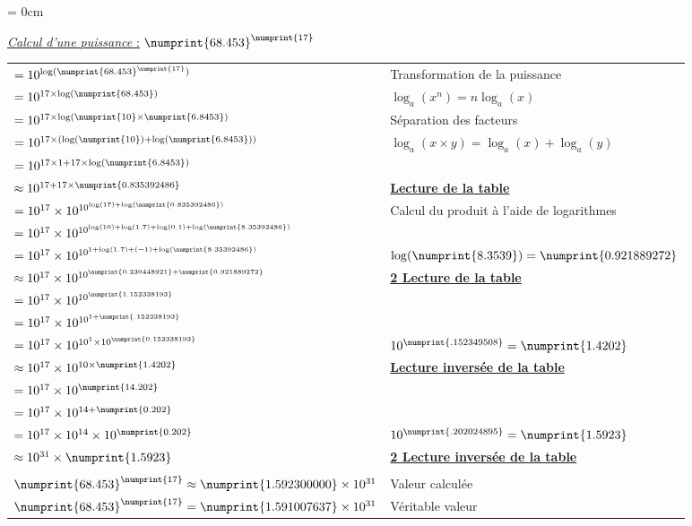 \documentclass[a4paper]{article}
\begin{document}
{\parindent = 0cm

\underline{\textit{Calcul d'une puissance} :} $\numprint{68.453}^{\numprint{17}}$
\vspace{0.2cm}

\begin{large}
\begin{tabular}{l|l}

$= 10 ^{\log ( \numprint{68.453}^{\numprint{17}} ) }$ & \small Transformation de la puissance \\
$= 10 ^{17 \times \log ( \numprint{68.453} ) }$ & \small $ \log_a ( x^n ) = n \log_a (x) $ \\
$= 10 ^{17 \times \log ( \numprint{10} \times \numprint{6.8453} ) }$ & \small Séparation des facteurs\\
$= 10 ^{17 \times (\log ( \numprint{10}) + \log (\numprint{6.8453} ))} $ & \small $ \log_a ( x \times y ) = \log_a (x) + \log_a (y) $\\
$= 10 ^{17 \times 1 + 17 \times \log (\numprint{6.8453} )}$ & \\
$\approx 10 ^{17 + 17 \times \numprint{0.835 392 486}}$ & \small \underline{\textbf{Lecture de la table}}\\
$= 10 ^{17} \times 10^{10^{\log(17) + \log(\numprint{0.835 392 486})}}$ & \small Calcul du produit à l'aide de logarithmes\\
$= 10 ^{17} \times 10^{10^{\log(10) + \log(1.7) + \log(0.1) + \log(\numprint{8.35392486})}}$ & \\
$= 10 ^{17} \times 10^{10^{1 + \log(1.7) + (-1) + \log(\numprint{8.35 392 486})}}$ & \small $\log(\numprint{8.35 39}) = \numprint{0.921 889 272}$ \\
$\approx 10 ^{17} \times 10^{10^{\numprint{0.230 448 921} + \numprint{0.921 889 272}}}$ & \small \underline{\textbf{2\up{ème} Lecture de la table}}\\
$= 10 ^{17} \times 10^{10^{\numprint{1.152338193}}}$ & \\
$= 10 ^{17} \times 10^{10^{1 + \numprint{.152338193}}}$ & \\
$= 10 ^{17} \times 10^{10^1 \times 10^{\numprint{0.152 338 193}}}$ & \small $10^{\numprint{.152 349 508}} = \numprint{1.4202}$\\
$\approx 10 ^{17} \times 10^{10 \times \numprint{1.4202}}$ & \small \underline{\textbf{Lecture inversée de la table}}\\
$= 10 ^{17} \times 10^{\numprint{14.202}}$ & \\
$= 10 ^{17} \times 10^{14 + \numprint{0.202}}$ & \\
$= 10 ^{17} \times 10^{14} \times 10^{\numprint{0.202}}$ & \small $10^{\numprint{.202 024 895}} = \numprint{1.5923}$\\
$\approx 10 ^{31} \times \numprint{1.5923}$ & \small \underline{\textbf{2\up{ème} Lecture inversée de la table}}\\
\\
$\numprint{68.453}^{\numprint{17}} \approx \numprint{1.592300000} \times 10^{31} $ & \small Valeur calculée\\
$\numprint{68.453}^{\numprint{17}} = \numprint{1.591007637} \times 10^{31} $ & \small Véritable valeur \\


\end{tabular}
\end{large}}
\end{document}
